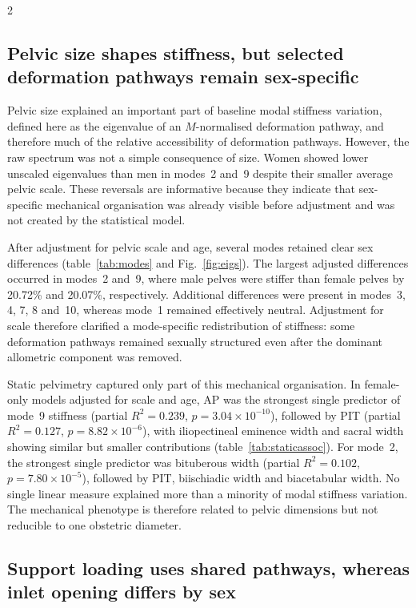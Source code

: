 \documentclass[openacc]{rsproca_new}
\begin{document}
\begin{multicols}{2}
\subsection{Pelvic size shapes stiffness, but selected deformation pathways remain sex-specific}

Pelvic size explained an important part of baseline modal stiffness variation, defined here as the eigenvalue of an $M$-normalised deformation pathway, and therefore much of the relative accessibility of deformation pathways. However, the raw spectrum was not a simple consequence of size. Women showed lower unscaled eigenvalues than men in modes~2 and~9 despite their smaller average pelvic scale. These reversals are informative because they indicate that sex-specific mechanical organisation was already visible before adjustment and was not created by the statistical model.

After adjustment for pelvic scale and age, several modes retained clear sex differences (table~\ref{tab:modes} and Fig.~\ref{fig:eigs}). The largest adjusted differences occurred in modes~2 and~9, where male pelves were stiffer than female pelves by 20.72\% and 20.07\%, respectively. Additional differences were present in modes~3, 4, 7, 8 and~10, whereas mode~1 remained effectively neutral. Adjustment for scale therefore clarified a mode-specific redistribution of stiffness: some deformation pathways remained sexually structured even after the dominant allometric component was removed.

Static pelvimetry captured only part of this mechanical organisation. In female-only models adjusted for scale and age, AP was the strongest single predictor of mode~9 stiffness (partial $R^2=0.239$, $p=3.04 \times 10^{-10}$), followed by PIT (partial $R^2=0.127$, $p=8.82 \times 10^{-6}$), with iliopectineal eminence width and sacral width showing similar but smaller contributions (table~\ref{tab:staticassoc}). For mode~2, the strongest single predictor was bituberous width (partial $R^2=0.102$, $p=7.80 \times 10^{-5}$), followed by PIT, biischiadic width and biacetabular width. No single linear measure explained more than a minority of modal stiffness variation. The mechanical phenotype is therefore related to pelvic dimensions but not reducible to one obstetric diameter.

\subsection{Support loading uses shared pathways, whereas inlet opening differs by sex}



\end{multicols}
\end{document}
